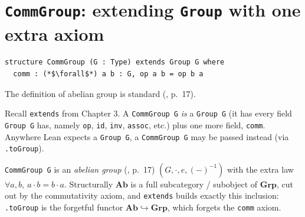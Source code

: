 \section{\texorpdfstring{\texttt{CommGroup}: extending \texttt{Group} with one extra axiom}{CommGroup: extending Group with one extra axiom}}\label{sec:09-rings:02-comm-group:1}

\begin{lstlisting}
structure CommGroup (G : Type) extends Group G where
  comm : (*$\forall$*) a b : G, op a b = op b a
\end{lstlisting}

The definition of abelian group is standard (\cite{DummitFoote2003}, p.~17).

Recall \texttt{extends} from Chapter 3. A \texttt{CommGroup G} \emph{is} a \texttt{Group G} (it has every field \texttt{Group G} has, namely \texttt{op}, \texttt{id}, \texttt{inv}, \texttt{assoc}, etc.) plus one more field, \texttt{comm}. Anywhere Lean expects a \texttt{Group G}, a \texttt{CommGroup G} may be passed instead (via \texttt{.toGroup}).

\begin{mathreading}

\texttt{CommGroup G} is an \emph{abelian group} (\cite{DummitFoote2003}, p.~17) \((G, \cdot, e,
(-)^{-1})\) with the extra law \(\forall a,b,\ a\cdot b = b\cdot a\). Structurally \(\mathbf{Ab}\) is a full subcategory / subobject of \(\mathbf{Grp}\), cut out by the commutativity axiom, and \texttt{extends} builds exactly this inclusion: \texttt{.toGroup} is the forgetful functor \(\mathbf{Ab} \hookrightarrow \mathbf{Grp}\), which forgets the \texttt{comm} axiom.

\end{mathreading}
